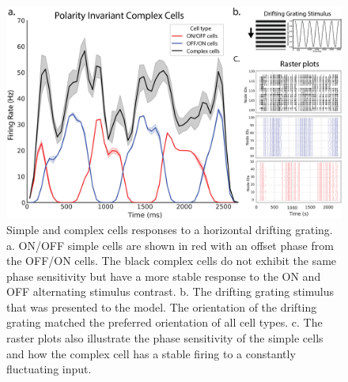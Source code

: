 \documentclass[12pt]{article}
\begin{document}
\begin{figure}[H]
    \centering
    \includegraphics[width=1 \textwidth]{figures/complex_invariance_figure.png}
    \caption{Simple and complex cells responses to a horizontal drifting grating. a. ON/OFF simple cells are shown in red with an offset phase from the OFF/ON cells. The black complex cells do not exhibit the same phase sensitivity but have a more stable response to the ON and OFF alternating stimulus contrast. b. The drifting grating stimulus that was presented to the model. The orientation of the drifting grating matched the preferred orientation of all cell types. c. The raster plots also illustrate the phase sensitivity of the simple cells and how the complex cell has a stable firing to a constantly fluctuating input.}
    \label{fig:polarity invariance}
\end{figure}
\end{document}
